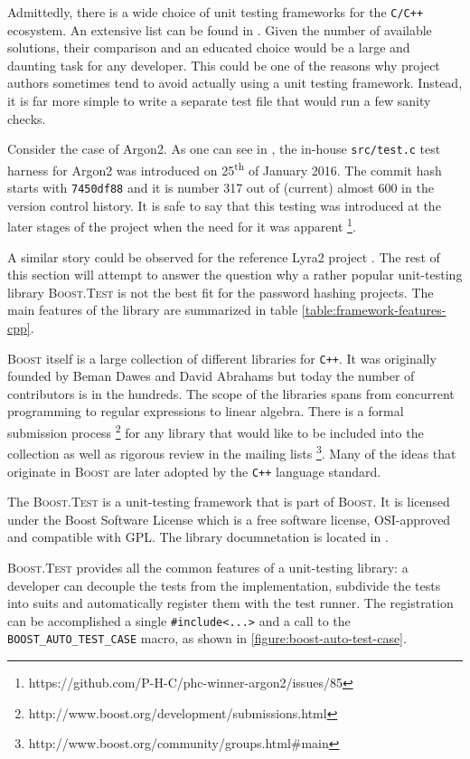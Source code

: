Admittedly, there is a wide choice of unit testing frameworks for the \texttt{C/C++} ecosystem. An extensive list can be found in \cite{wiki:2017:frameworks-c, wiki:2017:frameworks-cpp}. Given the number of available solutions, their comparison and an educated choice would be a large and daunting task for any developer. This could be one of the reasons why project authors sometimes tend to avoid actually using a unit testing framework. Instead, it is far more simple to write a separate test file that would run a few sanity checks.

Consider the case of Argon2. As one can see in \cite{github:2017:argon2}, the in-house \texttt{src/test.c} test harness for Argon2 was introduced on 25\textsuperscript{th} of January 2016. The commit hash starts with \texttt{7450df88} and it is number 317 out of (current) almost 600 in the version control history. It is safe to say that this testing was introduced at the later stages of the project when the need for it was apparent \footnote{https://github.com/P-H-C/phc-winner-argon2/issues/85}.

A similar story could be observed for the reference Lyra2 project \cite{github:2017:lyra}. The rest of this section will attempt to answer the question why a rather popular unit-testing library \textsc{Boost.Test} is not the best fit for the password hashing projects. The main features of the library are summarized in table \ref{table:framework-features-cpp}.

\textsc{Boost} itself is a large collection of different libraries for \texttt{C++}. It was originally founded by Beman Dawes and David Abrahams but today the number of contributors is in the hundreds. The scope of the libraries spans from concurrent programming to regular expressions to linear algebra. There is a formal submission process \footnote{http://www.boost.org/development/submissions.html} for any library that would like to be included into the collection as well as rigorous review in the mailing lists \footnote{http://www.boost.org/community/groups.html\#main}. Many of the ideas that originate in \textsc{Boost} are later adopted by the \texttt{C++} language standard.

The \textsc{Boost.Test} is a unit-testing framework that is part of \textsc{Boost}. It is licensed under the Boost Software License which is a free software license, OSI-approved and compatible with GPL. The library documnetation is located in \cite{boost:2017:test-docs}.

\textsc{Boost.Test} provides all the common features of a unit-testing library: a developer can decouple the tests from the implementation, subdivide the tests into suits and automatically register them with the test runner. The registration can be accomplished a single \texttt{#include<...>} and a call to the \texttt{BOOST_AUTO_TEST_CASE} macro, as shown in \ref{figure:boost-auto-test-case}.

